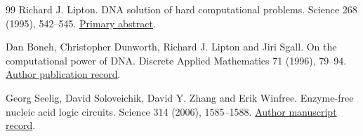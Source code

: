 \begin{thebibliography}{99}
 Richard J. Lipton. DNA solution of hard computational problems. Science 268 (1995), 542--545. \href{https://pubmed.ncbi.nlm.nih.gov/7725098/}{Primary abstract}.

 Dan Boneh, Christopher Dunworth, Richard J. Lipton and Jiri Sgall. On the computational power of DNA. Discrete Applied Mathematics 71 (1996), 79--94. \href{https://crypto.stanford.edu/~dabo/pubs/abstracts/biocircuit.html}{Author publication record}.

 Georg Seelig, David Soloveichik, David Y. Zhang and Erik Winfree. Enzyme-free nucleic acid logic circuits. Science 314 (2006), 1585--1588. \href{https://authors.library.caltech.edu/records/vf8a9-45s13}{Author manuscript record}.

\end{thebibliography}
